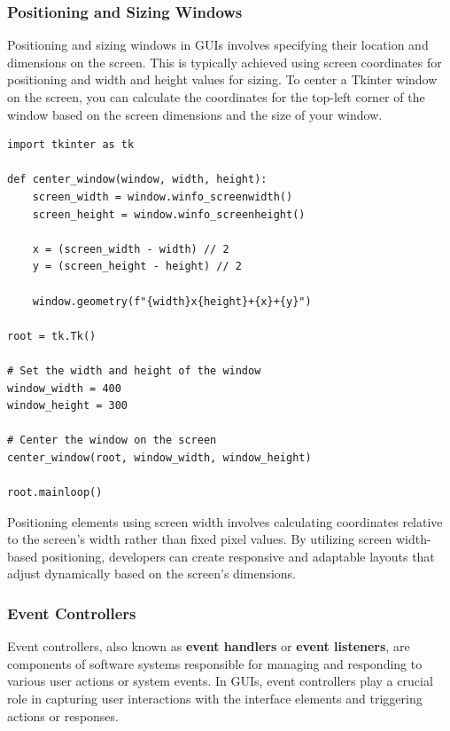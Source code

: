 \subsubsection{Positioning and Sizing Windows}
Positioning and sizing windows in GUIs involves specifying their location and dimensions on the screen. This is typically achieved using screen coordinates for positioning and width and height values for sizing. To center a Tkinter window on the screen, you can calculate the coordinates for the top-left corner of the window based on the screen dimensions and the size of your window.
\begin{codebox}
\begin{verbatim}
import tkinter as tk

def center_window(window, width, height):
    screen_width = window.winfo_screenwidth()
    screen_height = window.winfo_screenheight()
    
    x = (screen_width - width) // 2
    y = (screen_height - height) // 2
    
    window.geometry(f"{width}x{height}+{x}+{y}")

root = tk.Tk()

# Set the width and height of the window
window_width = 400
window_height = 300

# Center the window on the screen
center_window(root, window_width, window_height)

root.mainloop()
\end{verbatim}
\end{codebox}

Positioning elements using screen width involves calculating coordinates relative to the screen's width rather than fixed pixel values. By utilizing screen width-based positioning, developers can create responsive and adaptable layouts that adjust dynamically based on the screen's dimensions.

\newpage


\newpage
\subsubsection{Event Controllers}
Event controllers, also known as \textbf{event handlers} or \textbf{event listeners}, are components of software systems responsible for managing and responding to various user actions or system events. In GUIs, event controllers play a crucial role in capturing user interactions with the interface elements and triggering actions or responses.

